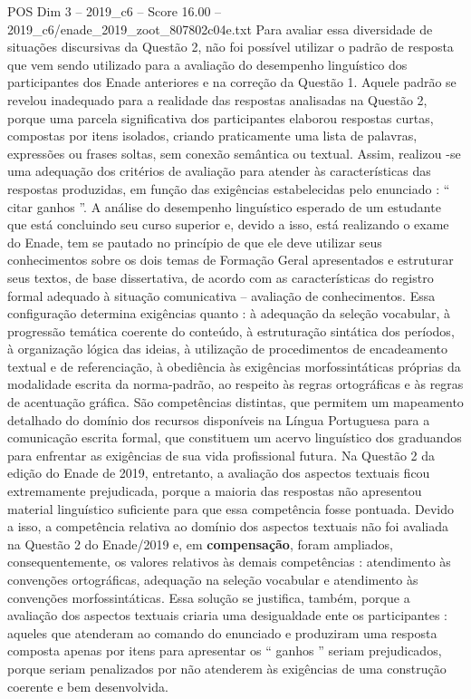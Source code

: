 \begin{textsample}{POS Dim 3 – 2019\_c6 – Score 16.00 – 2019\_c6/enade\_2019\_zoot\_807802c04e.txt}
Para avaliar essa diversidade de situações discursivas da Questão 2, não foi possível utilizar o padrão de resposta que vem sendo utilizado para a avaliação do desempenho linguístico dos participantes dos Enade anteriores e na correção da Questão 1.
Aquele padrão se revelou inadequado para a realidade das respostas analisadas na Questão 2, porque uma parcela significativa dos participantes elaborou respostas curtas, compostas por itens isolados, criando praticamente uma lista de palavras, expressões ou frases soltas, sem conexão semântica ou textual.
Assim, realizou -se uma adequação dos critérios de avaliação para atender às características das respostas produzidas, em função das exigências estabelecidas pelo enunciado : “ citar ganhos ”.
A análise do desempenho linguístico esperado de um estudante que está concluindo seu curso superior e, devido a isso, está realizando o exame do Enade, tem se pautado no princípio de que ele deve utilizar seus conhecimentos sobre os dois temas de Formação Geral apresentados e estruturar seus textos, de base dissertativa, de acordo com as características do registro formal adequado à situação comunicativa – avaliação de conhecimentos.
Essa configuração determina exigências quanto : à adequação da seleção vocabular, à progressão temática coerente do conteúdo, à estruturação sintática dos períodos, à organização lógica das ideias, à utilização de procedimentos de encadeamento textual e de referenciação, à obediência às exigências morfossintáticas próprias da modalidade escrita da norma-padrão, ao respeito às regras ortográficas e às regras de acentuação gráfica.
São competências distintas, que permitem um mapeamento detalhado do domínio dos recursos disponíveis na Língua Portuguesa para a comunicação escrita formal, que constituem um acervo linguístico dos graduandos para enfrentar as exigências de sua vida profissional futura.
Na Questão 2 da edição do Enade de 2019, entretanto, a avaliação dos aspectos textuais ficou extremamente prejudicada, porque a maioria das respostas não apresentou material linguístico suficiente para que essa competência fosse pontuada.
Devido a isso, a competência relativa ao domínio dos aspectos textuais não foi avaliada na Questão 2 do Enade/2019 e, em \textbf{compensação}, foram ampliados, consequentemente, os valores relativos às demais competências : atendimento às convenções ortográficas, adequação na seleção vocabular e atendimento às convenções morfossintáticas.
Essa solução se justifica, também, porque a avaliação dos aspectos textuais criaria uma desigualdade ente os participantes : aqueles que atenderam ao comando do enunciado e produziram uma resposta composta apenas por itens para apresentar os “ ganhos ” seriam prejudicados, porque seriam penalizados por não atenderem às exigências de uma construção coerente e bem desenvolvida.

\end{textsample}
